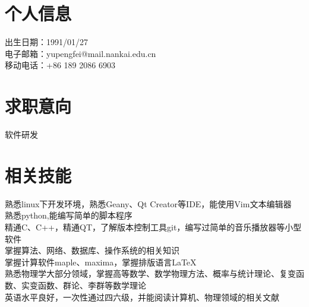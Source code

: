 \documentclass{res}
\begin{document}
 
\begin{CJK}{UTF8}{gbsn}


                                  
\begin{resume}

\section{个人信息} 
出生日期：1991/01/27\\
电子邮箱：yupengfei@mail.nankai.edu.cn\\
移动电话：+86 189 2086 6903
\section{求职意向}          
    软件研发         
 
\section{相关技能}          
    熟悉linux下开发环境，熟悉Geany、Qt Creator等IDE，能使用Vim文本编辑器\\
    熟悉python,能编写简单的脚本程序\\
    精通C、C++，精通QT，了解版本控制工具git，编写过简单的音乐播放器等小型软件   \\  
    掌握算法、网络、数据库、操作系统的相关知识       \\
    掌握计算软件maple、maxima，掌握排版语言\LaTeX{}\\    
    熟悉物理学大部分领域，掌握高等数学、数学物理方法、概率与统计理论、复变函数、实变函数、群论、李群等数学理论\\
    英语水平良好，一次性通过四六级，并能阅读计算机、物理领域的相关文献
             

 

\end{resume}
\end{CJK}
\end{document}
